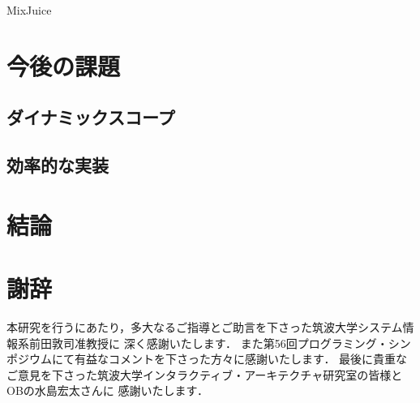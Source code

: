 \documentclass[a4paper,11pt,dvipdfmx]{jreport}
\makeatletter
\renewenvironment{thebibliography}[1]%
{\chapter*{\bibname\@mkboth{\bibname}{\bibname}}%
	\addcontentsline{toc}{chapter}{\numberline{}\bibname}%
	\list{\@biblabel{\@arabic\c@enumiv}}%
	{\settowidth\labelwidth{\@biblabel{#1}}%
		\leftmargin\labelwidth
		\advance\leftmargin\labelsep
		\@openbib@code
		\usecounter{enumiv}%
		\let\p@enumiv\@empty
		\renewcommand\theenumiv{\@arabic\c@enumiv}}%
	\sloppy
	\clubpenalty4000
	\@clubpenalty\clubpenalty
	\widowpenalty4000%
	\sfcode`\.\@m}
{\def\@noitemerr
	{\@latex@warning{Empty `thebibliography' environment}}%
	\endlist}
\makeatother
\begin{document}
MixJuice


\chapter{今後の課題}
\label{chapter:future-work}

\section{ダイナミックスコープ}

\section{効率的な実装}


\chapter{結論}
\label{chapter:conclusion}


\chapter*{謝辞}

本研究を行うにあたり，多大なるご指導とご助言を下さった筑波大学システム情報系前田敦司准教授に
深く感謝いたします．
また第56回プログラミング・シンポジウムにて有益なコメントを下さった方々に感謝いたします．
最後に貴重なご意見を下さった筑波大学インタラクティブ・アーキテクチャ研究室の皆様とOBの水島宏太さんに
感謝いたします．

\newpage

\renewcommand{\bibname}{参考文献}




%
%
\end{document}
